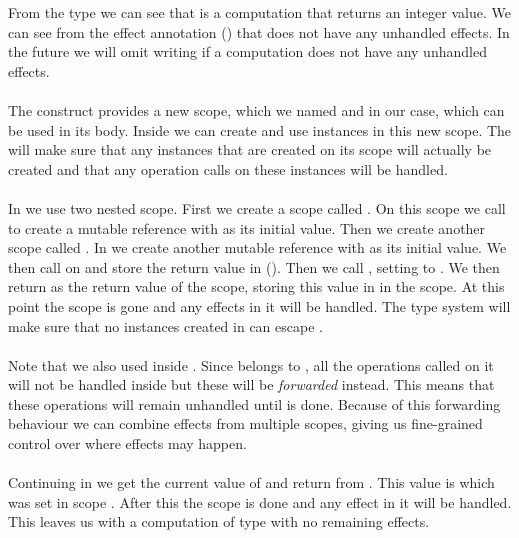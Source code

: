 From the type we can see that  is a computation that returns an integer value.
We can see from the effect annotation (\ident{!{}}) that  does not have any unhandled effects.
In the future we will omit writing \ident{!{}} if a computation does not have any unhandled effects.
\\\\
The  construct provides a new scope, which we named  and  in our case, which can be used in its body.
Inside  we can create and use instances in this new scope.
The  will make sure that any instances that are created on its scope will actually be created and that any operation calls on these instances will be handled.
\\\\
In  we use two nested scope.
First we create a scope called .
On this scope we call  to create a mutable reference  with  as its initial value.
Then we create another scope called .
In  we create another mutable reference  with  as its initial value.
We then call  on  and store the return value in  ().
Then we call , setting  to .
We then return  as the return value of the  scope, storing this value in  in the  scope.
At this point the  scope is gone and any effects in it will be handled.
The type system will make sure that no instances created in  can escape .
\\\\
Note that we also used  inside .
Since  belongs to , all the operations called on it will not be handled inside  but these will be \emph{forwarded} instead.
This means that these operations will remain unhandled until  is done.
Because of this forwarding behaviour we can combine effects from multiple scopes, giving us fine-grained control over where effects may happen.
\\\\
Continuing in  we get the current value of  and return from .
This value is  which was set in scope .
After this the scope  is done and any effect in it will be handled.
This leaves us with a computation of type  with no remaining effects.

